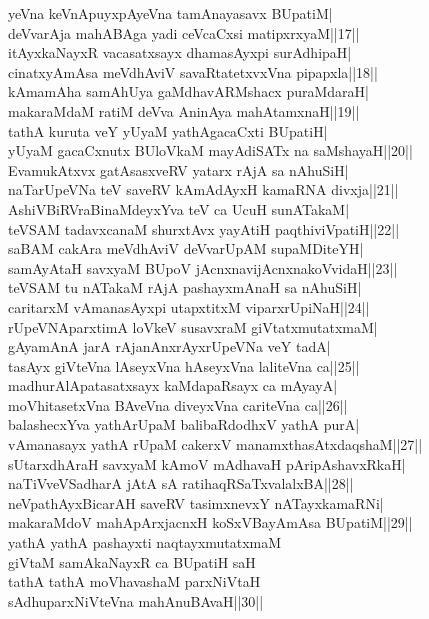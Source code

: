 \documentclass{article}
\begin{document}
yeVna keVnApuyxpAyeVna tamAnayasavx BUpatiM|\\
deVvarAja mahABAga yadi ceVcaCxsi matipxrxyaM||17||\\
itAyxkaNayxR vacasatxsayx dhamasAyxpi surAdhipaH|\\
cinatxyAmAsa meVdhAviV savaRtatetxvxVna pipapxla||18||\\
kAmamAha samAhUya gaMdhavARMshacx puraMdaraH|\\
makaraMdaM ratiM deVva AninAya mahAtamxnaH||19||\\
tathA kuruta veY yUyaM yathAgacaCxti BUpatiH|\\
yUyaM gacaCxnutx BUloVkaM mayAdiSATx na saMshayaH||20||\\
EvamukAtxvx gatAsasxveRV yatarx rAjA sa nAhuSiH|\\
naTarUpeVNa teV saveRV kAmAdAyxH kamaRNA divxja||21||\\
AshiVBiRVraBinaMdeyxYva teV ca UcuH sunATakaM|\\
teVSAM tadavxcanaM shurxtAvx yayAtiH paqthiviVpatiH||22||\\
saBAM cakAra meVdhAviV deVvarUpAM supaMDiteYH|\\
samAyAtaH savxyaM BUpoV jAcnxnavijAcnxnakoVvidaH||23||\\
teVSAM tu nATakaM rAjA pashayxmAnaH sa nAhuSiH|\\
caritarxM vAmanasAyxpi utapxtitxM viparxrUpiNaH||24||\\
rUpeVNAparxtimA loVkeV susavxraM giVtatxmutatxmaM|\\
gAyamAnA jarA rAjanAnxrAyxrUpeVNa veY tadA|\\
tasAyx giVteVna lAseyxVna hAseyxVna laliteVna ca||25||\\
madhurAlApatasatxsayx kaMdapaRsayx ca mAyayA|\\
moVhitasetxVna BAveVna diveyxVna cariteVna ca||26||\\
balashecxYva yathArUpaM balibaRdodhxV yathA purA|\\
vAmanasayx yathA rUpaM cakerxV manamxthasAtxdaqshaM||27||\\
sUtarxdhAraH savxyaM kAmoV mAdhavaH pAripAshavxRkaH|\\
naTiVveVSadharA jAtA sA ratihaqRSaTxvalalxBA||28||\\
neVpathAyxBicarAH saveRV tasimxnevxY nATayxkamaRNi|\\
makaraMdoV mahApArxjacnxH koSxVBayAmAsa BUpatiM||29||\\
yathA yathA pashayxti naqtayxmutatxmaM\\
giVtaM samAkaNayxR ca BUpatiH saH\\
tathA tathA moVhavashaM parxNiVtaH\\
sAdhuparxNiVteVna mahAnuBAvaH||30||
\end{document}
